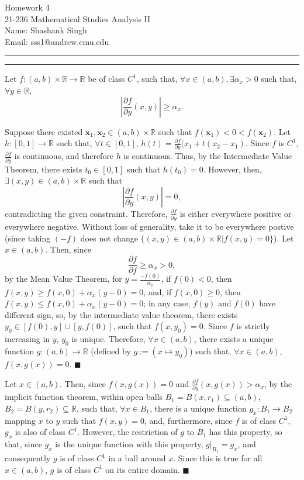 \documentclass[11pt]{article}
\makeatletter
\newcounter{questionCounter}
\newcounter{partCounter}[questionCounter]
\newenvironment{question}[2][\arabic{questionCounter}]{%
    \setcounter{partCounter}{0}%
    \vspace{.25in} \hrule \vspace{0.5em}%
        \noindent{\bf #2}%
    \vspace{0.8em} \hrule \vspace{.10in}%
    \addtocounter{questionCounter}{1}%
}{}
\newcommand{\myname}{Shashank Singh}
\newcommand{\myandrew}{sss1@andrew.cmu.edu}
\newcommand{\myclass}{21-236 Mathematical Studies Analysis II}
\newcommand{\myhwnum}{4}
\makeatother
\begin{document}
\thispagestyle{plain}

{\Large Homework \myhwnum} \\
\myclass \\
Name: \myname \\
Email: \myandrew \\
\begin{question}{Problem 1} Let
$f: (a,b) \times \mathbb{R} \rightarrow \mathbb{R}$ be of class $C^1$, such
that, $\forall x \in (a,b), \exists \alpha_x > 0$ such that,
$\forall y \in \mathbb{R}$,
\[\left|\frac{\partial f}{\partial y}(x,y)\right| \geq \alpha_x.\]

Suppose there existed $\mathbf{x}_1,\mathbf{x}_2 \in (a,b) \times \mathbb{R}$
such that $f(\mathbf{x}_1) < 0 < f(\mathbf{x}_2)$. Let
$h: [0,1] \rightarrow \mathbb{R}$ such that, $\forall t \in [0,1]$,
$h(t) = \frac{\partial f}{\partial y}(x_1 + t(x_2 - x_1)$. Since $f$ is $C^1$,
$\frac{\partial f}{\partial y}$ is continuous, and therefore $h$ is
continuous. Thus, by the Intermediate Value Theorem, there exists
$t_0 \in [0,1]$ such that $h(t_0) = 0$. However, then,
$\exists (x,y) \in (a,b) \times \mathbb{R}$ such that
\[\left|\frac{\partial f}{\partial y}(x,y)\right| = 0,\]
contradicting the given constraint. Therefore, $\frac{\partial f}{\partial y}$
is either everywhere positive or everywhere negative.
Without loss of generality, take it to be everywhere postive (since taking
$(-f)$ does not change $\{(x,y) \in (a,b) \times \mathbb{R} | f(x,y) = 0\}$).
Let $x \in (a,b)$. Then, since
\[\frac{\partial f}{\partial f} \geq \alpha_x > 0,\] by the Mean Value
Theorem, for $y = \frac{-f(0)}{\alpha_x}$, if $f(0) <  0$, then
$f(x,y) \geq f(x,0) + \alpha_x(y - 0) = 0$, and, if $f(x,0) \geq 0$, then
$f(x,y) \leq f(x,0) + \alpha_x(y - 0) = 0$; in any case, $f(y)$ and $f(0)$ have
different sign, so, by the intermediate value theorem, there exists
$y_0 \in [f(0),y] \cup [y,f(0)]$, such that $f(x,y_0) = 0$. Since $f$ is strictly
increasing in $y$, $y_0$ is unique. Therefore, $\forall x \in (a,b)$, there
exists a unique function $g: (a,b) \rightarrow \mathbb{R}$ (defined by
$g := (x \mapsto y_0)$) such that, $\forall x \in (a,b)$, $f(x,g(x)) = 0$.
\qquad $\blacksquare$

Let $x \in (a,b)$. Then, since $f(x,g(x)) = 0$ and
$\frac{\partial f}{\partial y} (x,g(x)) > \alpha_x$, by the implicit function
theorem, within open balls $B_1 = B(x,r_1) \subseteq (a,b)$,
$B_2 = B(y,r_2) \subseteq \mathbb{R}$, such that, $\forall x \in B_1$, there
is a unique function $g_x: B_1 \rightarrow B_2$ mapping $x$ to $y$ such that
$f(x,y) = 0$, and, furthermore, since $f$ is of class $C^1$, $g_x$ is also of
class $C^1$. However, the restriction of $g$ to $B_1$ has this property, so
that, since $g_x$ is the unique function with this property,
$g |_{B_1} = g_x$, and consequently $g$ is of class $C^1$ in a ball around
$x$. Since this is true for all $x \in (a,b)$, $g$ is of class $C^1$ on its
entire domain. \qquad $\blacksquare$
\end{question}
\end{document}

